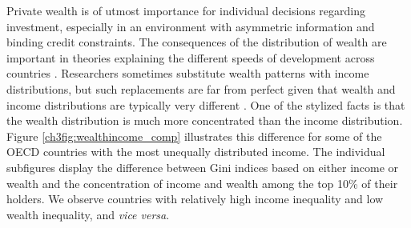 \begin{refsection}
Private wealth is of utmost importance for individual  decisions regarding investment, especially in an environment with asymmetric information and binding credit constraints. The consequences of the distribution of wealth are important in theories explaining the different speeds of development across countries \parencite{roine2015long}. Researchers sometimes substitute wealth patterns with income distributions, but such replacements are far from perfect given that wealth and income distributions are typically very different \parencite{bagchi2015does}. One of the stylized facts is that the wealth distribution is much more concentrated than the income distribution. Figure \ref{ch3fig:wealthincome_comp} illustrates this difference for some of the \ac{OECD} countries with the most unequally distributed income. The individual subfigures display the difference between Gini indices based on either income or wealth and the concentration of income and wealth among the top 10\% of their holders. We observe countries with relatively high income inequality and low wealth inequality, and \textit{vice versa}.


\end{refsection}

